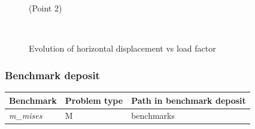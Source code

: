 \begin{figure}[!htb]
\begin{center}
\begin{minipage}[t]{0.48\textwidth}
\begin{center}
    \centerline{(Point 2)}
    \end{center}
   \end{minipage}\\
  \end{center}
  \caption{Evolution of horizontal displacement vs load factor}
  \label{ex2_loadp}
\end{figure}

\subsubsection*{Benchmark deposit}
\begin{tabular}{|l|l|l|}
  \hline
  Benchmark & Problem type & Path in benchmark deposit \\
  \hline
 \emph{m\_mises} & M & benchmarks\verb \M\ \\
  \hline
\end{tabular}
